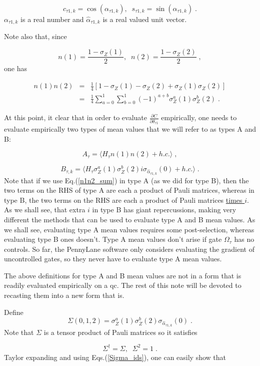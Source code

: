 \documentclass[12pt]{article}
\newcommand{\beq}{\begin{equation}}
\newcommand{\eeq}{\end{equation}}
\newcommand{\beqa}{\begin{eqnarray}}
\newcommand{\eeqa}{\end{eqnarray}}
\begin{document}
{\beq
c_{\tau 1,k} = \cos(\alpha_{\tau 1,k}), \;\;
s_{\tau 1,k} = \sin(\alpha_{\tau 1,k})
\;.
\eeq
$\alpha_{\tau 1,k}$ is a real number
and $\hat{\alpha}_{\tau 1,k}$ is a real
valued unit vector.

Note also that, since

\beq
n(1)  = \frac{1-\sigma_Z(1)}{2}, \;\;
n(2)  = \frac{1-\sigma_Z(2)}{2}
\;,
\eeq
one has

\beqa
n(1)n(2) &=&
\frac{1}{4}[1 - \sigma_Z(1) - \sigma_Z(2)
+ \sigma_Z(1)\sigma_Z(2)]\\&=&
\frac{1}{4}\sum_{a=0}^1\sum_{b=0}^1 (-1)^{a+b}
 \sigma^a_Z(1)\sigma^b_Z(2)
\;.
\label{n1n2_sum}
\eeqa

At this point, it clear that
in order to evaluate
$\frac{\partial C}{\partial\theta_{\tau 1}}$
empirically, one needs to
evaluate empirically two
types of mean values
that we will refer to as types A and B:

\beq
A_\tau = \langle H_\tau n(1)n(2) + h.c.\rangle
\;,
\eeq

\beq
B_{\tau,k} = \langle H_\tau \sigma^a_Z(1)\sigma_Z^b(2)
i \sigma_{\hat{\alpha}_{\tau 1,k}}(0) + h.c.\rangle
\;.
\eeq
Note that if we use Eq.(\ref{n1n2_sum})
in type A (as we did for type B),
then the two terms on the RHS of type A
are each a product of Pauli matrices,
whereas in type B, the two terms on the RHS
are each a product of Pauli matrices \underline{times $i$}.
As we shall see, that extra $i$ in type B
has giant repercussions, making very different
the methods that can be used to evaluate  type A and B
mean values. As we shall see, evaluating
type A mean values
requires some post-selection, whereas
evaluating type B ones doesn't.
Type A mean values don't arise if
gate $\Omega_\tau$ has no controls.
So far, the PennyLane software only
considers evaluating the gradient of uncontrolled
gates, so they never have to evaluate
type A mean values.

The above definitions for type A and B
mean values are not in a form that is
readily evaluated empirically on a qc.
The rest of this note will be devoted to
recasting them into a new form that is.


Define
\beq
\Sigma(0,1,2) = \sigma^a_Z(1)\sigma_Z^b(2)
 \sigma_{\hat{\alpha}_{\tau 1,k}}(0)
\;.
\eeq
Note that $\Sigma$
is a tensor product of Pauli matrices so it satisfies

\beq
\Sigma^\dagger = \Sigma, \;\; \Sigma^2=1
\;.
\label{Sigma_ids}
\eeq
Taylor expanding and using Eqs.(\ref{Sigma_ids}),
one can easily show that

}
\end{document}
